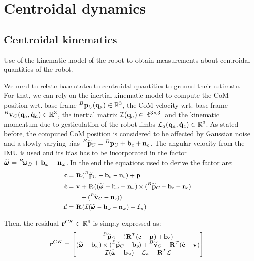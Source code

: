 \chapter{Centroidal dynamics}
\minitoc


\section{Centroidal kinematics}
Use of the kinematic model of the robot to obtain measurements about centroidal quantities of the robot.

We need to relate base states to centroidal quantities to ground their estimate. 
For that, we can rely on the inertial-kinematic model to compute the CoM position wrt. base frame $\prescript{B}{}{{\bf p}}_{C}({\bf q}_a) \in \mathbb{R}^3$, the CoM velocity wrt. 
base frame $\prescript{B}{}{{\bf v}}_{C}({\bf q}_a, \dot{{\bf q}}_a) \in \mathbb{R}^3$, the inertial matrix $\mathcal{I}({\bf q}_a) \in \mathbb{R}^{3\times 3}$, and  the kinematic momentum due to gesticulation 
of the robot limbs $\mathcal{L}_a({\bf q}_a, \dot{{\bf q}}_a) \in \mathbb{R}^{3}$. 
As stated before, the computed CoM position is considered to be affected by Gaussian noise and a slowly varying bias $\prescript{B}{}{\widetilde{{\bf p}}}_{C} = \prescript{B}{}{{\bf p}}_{C} + {\bf b}_{c} + {\bf n}_c$. 
The angular velocity from the IMU is used and its bias has to be incorporated in the factor $\prescript{}{}{\widetilde{\pmb{\omega}}}_{} = \prescript{B}{}{\pmb{\omega}}_{B} + {\bf b}_{\omega} + {\bf n}_{\omega}$.  
In the end the equations used to derive the factor are:
%
\begin{equation}
\small
\begin{split}
{\bf c} &= \prescript{}{}{{\bf R}}_{} (\prescript{B}{}{\widetilde{{\bf p}}}_{C} -  {\bf b}_{c} - {\bf n}_{c}) + \prescript{}{}{{\bf p}}_{}
\\
\dot{{\bf c}} &= 
\prescript{}{}{{\bf v}}_{} + \prescript{}{}{{\bf R}}_{}((\prescript{}{}{\widetilde{\pmb{\omega}}}_{} - {\bf b}_{\omega} - {\bf n}_{\omega}) \times (\prescript{B}{}{\widetilde{{\bf p}}}_{C} -  {\bf b}_c - {\bf n}_c) 
\\&~~~~~~+ (\prescript{B}{}{\widetilde{{\bf v}}}_{C} - {\bf n}_{v}))
\\
\mathcal{L} &= \prescript{}{}{{\bf R}}_{}(\mathcal{I} (\prescript{}{}{\widetilde{\pmb{\omega}}}_{} - {\bf b}_{\omega} - {\bf n}_{\omega}) + \mathcal{L}_a)
\end{split}
\end{equation}

Then, the residual ${\bf r}^{CK} \in \mathbb{R}^9$ is simply expressed as:
%
\begin{equation}
\small
{\bf r}^{CK}=
\begin{bmatrix}
\prescript{B}{}{\widetilde{{\bf p}}}_{C} - (\prescript{}{}{{\bf R}}_{}^T({\bf c} - \prescript{}{}{{\bf p}}_{}) + {\bf b}_{c})
\\
(\prescript{}{}{\widetilde{\pmb{\omega}}}_{} - {\bf b}_{\omega}) \times (\prescript{B}{}{\widetilde{{\bf p}}}_{C} -  {\bf b}_{p}) + \prescript{B}{}{\widetilde{{\bf v}}}_{C} - \prescript{}{}{{\bf R}}_{}^T(\dot{{\bf c}} - \prescript{}{}{{\bf v}}_{})
\\
\mathcal{I} (\prescript{}{}{\widetilde{\pmb{\omega}}}_{} - {\bf b}_{\omega}) + \mathcal{L}_a - \prescript{}{}{{\bf R}}_{}^T\mathcal{L}
\end{bmatrix}
\label{eq:CKFactor}
\end{equation}



